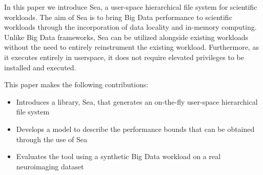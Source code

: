 
In this paper we introduce Sea, a user-space hierarchical file system for
scientific workloads. The aim of Sea is to bring Big Data performance to
scientific workloads through the incorporation of data locality and in-memory
computing. Unlike Big Data frameworks, Sea can be utilized alongside existing
workloads without the need to entirely reinstrument the existing workload.
Furthermore, as it executes entirely in userspace, it does not require elevated
privileges to be installed and executed.

This paper makes the following contributions:
\begin{itemize}
    \item Introduces a library, Sea, that generates an on-the-fly user-space
    hierarchical file system
    \item Develops a model to describe the performance bounds that can be
    obtained through the use of Sea
    \item Evaluates the tool using a synthetic Big Data workload on a real
    neuroimaging dataset
\end{itemize}







